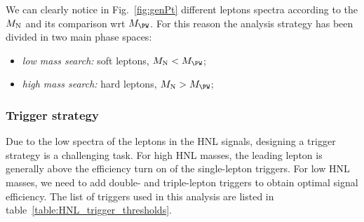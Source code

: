 We can clearly notice in Fig.~\ref{fig:genPt} different leptons \pt spectra according to the
$M_\mathrm{N}$ and its comparison wrt $M_\PW$. For this reason the analysis
strategy has been divided in two main phase spaces:
\begin{itemize}
\item \emph{low mass search:} soft leptons, $M_\hnl < M_\PW$;
\item \emph{high mass search:} hard leptons, $M_\hnl > M_\PW$;
\end{itemize}

\subsubsection{Trigger strategy}
Due to the low \pt spectra of the leptons in the HNL signals, designing a trigger strategy is a challenging task. 
For high HNL masses, the leading lepton \pt is generally above the efficiency turn on of the single-lepton triggers.
For low HNL masses, we need to add double- and triple-lepton triggers to obtain optimal signal efficiency.
The list of triggers used in this analysis are listed in table~\ref{table:HNL_trigger_thresholds}.


